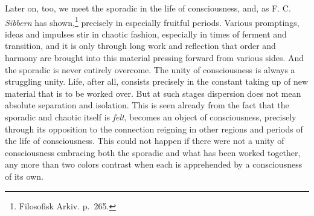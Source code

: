 \documentclass[12pt,a4paper]{book}
\newcommand{\opage}[1]{\marginnote{\footnotesize\textit{[#1]}}}
\begin{document}
Later on, too, we meet the sporadic in the life of consciousness, and, as
F.
C. \emph{Sibbern} has shown,\footnote{Filosofisk Arkiv. p.~265.}
precisely in especially fruitful periods. Various promptings, ideas and
impulses stir in chaotic fashion, especially in times of ferment and
transition, and it is only through long work and reflection that order and
harmony are brought into this material pressing forward from various
sides. And the sporadic is never entirely overcome. The unity of
consciousness is always a struggling unity. Life, after all, consists
precisely in the constant taking up of new material that is to be worked
over. But at such stages dispersion does not mean absolute separation and
isolation. This is seen already from the fact that the sporadic and
chaotic itself is \emph{felt}, becomes an object of consciousness,
precisely through its opposition to the connection reigning in other
\opage{172}regions and periods of the life of consciousness. This could not
happen if there were not a unity of consciousness embracing both the
sporadic and what has been worked together, any more than two colors
contrast when each is apprehended by a consciousness of its own.
\end{document}
